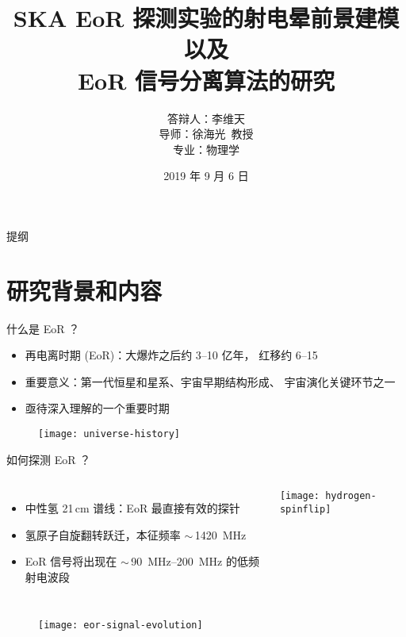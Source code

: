 \documentclass{beamer}
\title{%
  SKA EoR 探测实验的射电晕前景建模以及\texorpdfstring{\\}{ }%
  EoR 信号分离算法的研究%
}
\author{%
  答辩人：李维天\texorpdfstring{\\}{ / }
  导师：徐海光~教授\texorpdfstring{\\}{ / }
  专业：物理学
}
\institute{%
  物理与天文学院\\%
  上海交通大学%
}
\date{\small 2019 年 9 月 6 日}
\begin{document}
\maketitle

\begin{frame}{提\cspace{}纲}
  \tableofcontents[hideallsubsections]
\end{frame}


\section{研究背景和内容}

\begin{frame}{什么是 EoR ？}
  \begin{itemize}
    \item \alert{再电离时期 (EoR)}：大爆炸之后约 \numrange{3}{10} 亿年，
      红移约 \numrange{6}{15}
    \item \alert{重要意义}：第一代恒星和星系、宇宙早期结构形成、
      宇宙演化关键环节之一
    \item 亟待深入理解的一个重要时期
  \end{itemize}

  \vspace{-1ex}
  \begin{figure}
    \centering
    \texttt{[image: universe-history]}
  \end{figure}

\end{frame}

\begin{frame}{如何探测 EoR ？}
  \begin{columns}[onlytextwidth]
    \begin{itemize}
      \item \alert{中性氢 21\,cm 谱线}：EoR 最直接有效的探针
      \item 氢原子自旋翻转跃迁，本征频率 $\sim$\,\SI{1420}{\MHz}
      \item EoR 信号将出现在 $\sim$\,\SIrange{90}{200}{\MHz}
        的\alert{低频射电波段}
    \end{itemize}

    \texttt{[image: hydrogen-spinflip]}
  \end{columns}

  \vspace{-1ex}
  \begin{figure}
    \centering
    \texttt{[image: eor-signal-evolution]}
  \end{figure}
  \vspace{1ex}
\end{frame}
\end{document}
